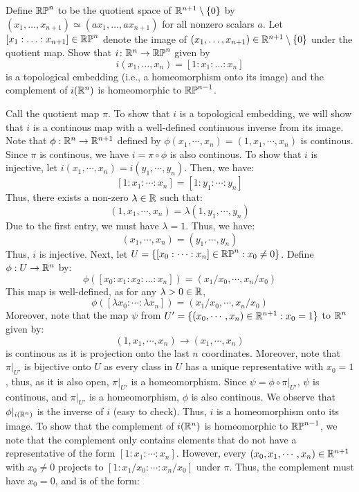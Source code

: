 \documentclass[12pt]{article}
\begin{document}
\begin{problab}{3}
Define $\mathbb{RP}^n$ to be the quotient space of $\mathbb R^{n+1}\setminus \{0\}$ by $(x_1, \hdots, x_{n+1}) \simeq (a x_1, \hdots, a x_{n+1})$ for all nonzero scalars $a$. Let $[x_1: \hdots : x_{n+1}] \in \mathbb{RP}^n$ denote the image of $(x_1, \hdots, x_{n+1}) \in \mathbb{R}^{n+1} \setminus \{ 0 \}$ under the quotient map. Show that $i \colon \mathbb{R}^n \to \mathbb{RP}^n$ given by 
$$ i (x_1, \hdots, x_n) = [1: x_1 : \hdots : x_n ] $$
is a topological embedding (i.e., a homeomorphism onto its image) and the complement of $i(\mathbb{R}^n)$ is homeomorphic to $\mathbb{RP}^{n-1}$.
\end{problab}

\begin{solu}
    Call the quotient map $\pi$. To show that $i$ is a topological embedding, we will show that $i$ is a continous map with a well-defined continuous inverse from its image. \bbni 
    Note that $\phi: \mathbb R^n \to \mathbb R^{n+1}$ defined by $\phi(x_1, \cdots, x_n) = (1, x_1, \cdots, x_n)$ is continous. Since $\pi$ is continous, we have $i = \pi \circ \phi$ is also continous.  \bbni
    To show that $i$ is injective, let $i(x_1, \cdots, x_n) = i(y_1, \cdots, y_n)$. Then, we have:
    \[ [1 : x_1 : \cdots : x_n] = [1 : y_1 : \cdots : y_n] \]
    Thus, there exists a non-zero $\lambda \in \mathbb R$ such that:
    \[ (1, x_1, \cdots, x_n) = \lambda(1, y_1, \cdots, y_n) \]
    Due to the first entry, we must have $\lambda = 1$. Thus, we have:
    \[ (x_1, \cdots, x_n) = (y_1, \cdots, y_n) \]
    Thus, $i$ is injective. Next, let $U = \{[x_0 : \cdots : x_n] \in \mathbb{RP}^n : x_0 \neq 0 \}$. Define $\phi: U \to \mathbb R^n$ by: 
    \[ \phi([x_0 : x_1: x_2: \hdots : x_{n}]) = (x_1/x_0, \cdots, x_{n}/x_0) \]
    This map is well-defined, as for any $\lambda > 0 \in \mathbb R$, 
    \[ \phi([\lambda x_0 : \cdots : \lambda x_n]) = (x_1/x_0, \cdots, x_{n}/x_0) \]
    Moreover, note that the map $\psi$ from $U' = \{(x_0, \cdots, x_n) \in \mathbb R^{n+1} : x_0 = 1\}$ to $\mathbb R^n$ given by:
    \[ (1, x_1, \cdots, x_n) \to (x_1, \cdots, x_{n}) \]
    is continous as it is projection onto the last $n$ coordinates. Moreover, note that $\pi|_{U'}$ is bijective onto $U$ as every class in $U$ has a unique representative with $x_0 = 1$, thus, as it is also open, $\pi|_{U'}$ is a homeomorphism. Since $\psi = \phi \circ \pi|_{U'}$, $\psi$ is continous, and $\pi|_{U'}$ is a homeomorphism, $\phi$ is also continous. \bbni 
    We observe that $\phi|_{i(\mathbb R^n)}$ is the inverse of $i$ (easy to check). Thus, $i$ is a homeomorphism onto its image. \bbni
    To show that the complement of $i(\mathbb R^n)$ is homeomorphic to $\mathbb{RP}^{n-1}$, we note that the complement only contains elements that do not have a representative of the form $[ 1 : x_1 : \cdots : x_n]$. However, every $(x_0, x_1, \cdots, x_n) \in \mathbb R^{n+1}$ with $x_0 \neq 0$ projects to $[1 : x_1/x_0 : \cdots : x_n/x_0]$ under $\pi$. Thus, the complement must have $x_0 = 0$, and is of the form:
    \[ \]

\end{solu}
\newpage
\end{document}
